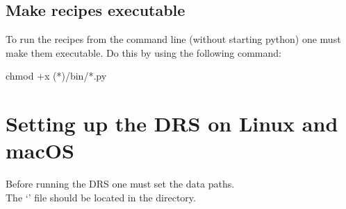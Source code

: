 \subsection{Make recipes executable}
\label{ch:install:installunix:executable}

\noindent To run the recipes from the command line (without starting python) one must make them executable. Do this by using the following command:
\begin{cmdbox}
chmod +x (*\InstallDIR*)/bin/*.py
\end{cmdbox}


\clearpage
\newpage
\section{Setting up the DRS on Linux and macOS}
\label{ch:install:setup}

Before running the DRS one must set the data paths. \\

\noindent The `\configtxtfile' file should be located in the \userDIR directory.

